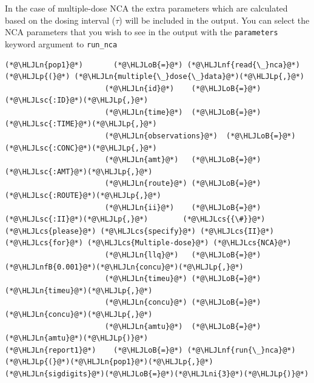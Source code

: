 \documentclass[12pt,a4paper]{article}
\newcommand{\HLJLn}[1]{#1}
\newcommand{\HLJLnf}[1]{\textcolor[RGB]{66,102,213}{#1}}
\newcommand{\HLJLsc}[1]{\textcolor[RGB]{201,61,57}{#1}}
\newcommand{\HLJLnfB}[1]{\textcolor[RGB]{59,151,46}{#1}}
\newcommand{\HLJLni}[1]{\textcolor[RGB]{59,151,46}{#1}}
\newcommand{\HLJLoB}[1]{\textcolor[RGB]{102,102,102}{\textbf{#1}}}
\newcommand{\HLJLp}[1]{#1}
\newcommand{\HLJLcs}[1]{\textcolor[RGB]{153,153,119}{\textit{#1}}}
\begin{document}
In the case of multiple-dose NCA the extra parameters which are calculated based on the dosing interval (\ensuremath{\tau}) will be included in the output. You can select the NCA parameters that you wish to see in the output with the \texttt{parameters} keyword argument to \texttt{run\_nca}


\begin{lstlisting}
(*@\HLJLn{pop1}@*)       (*@\HLJLoB{=}@*) (*@\HLJLnf{read{\_}nca}@*)(*@\HLJLp{(}@*) (*@\HLJLn{multiple{\_}dose{\_}data}@*)(*@\HLJLp{,}@*)
                       (*@\HLJLn{id}@*)    (*@\HLJLoB{=}@*) (*@\HLJLsc{:ID}@*)(*@\HLJLp{,}@*)
                       (*@\HLJLn{time}@*)  (*@\HLJLoB{=}@*) (*@\HLJLsc{:TIME}@*)(*@\HLJLp{,}@*)
                       (*@\HLJLn{observations}@*)  (*@\HLJLoB{=}@*) (*@\HLJLsc{:CONC}@*)(*@\HLJLp{,}@*)
                       (*@\HLJLn{amt}@*)   (*@\HLJLoB{=}@*) (*@\HLJLsc{:AMT}@*)(*@\HLJLp{,}@*)
                       (*@\HLJLn{route}@*) (*@\HLJLoB{=}@*) (*@\HLJLsc{:ROUTE}@*)(*@\HLJLp{,}@*)
                       (*@\HLJLn{ii}@*)    (*@\HLJLoB{=}@*) (*@\HLJLsc{:II}@*)(*@\HLJLp{,}@*)        (*@\HLJLcs{{\#}}@*) (*@\HLJLcs{please}@*) (*@\HLJLcs{specify}@*) (*@\HLJLcs{II}@*) (*@\HLJLcs{for}@*) (*@\HLJLcs{Multiple-dose}@*) (*@\HLJLcs{NCA}@*)
                       (*@\HLJLn{llq}@*)   (*@\HLJLoB{=}@*) (*@\HLJLnfB{0.001}@*)(*@\HLJLn{concu}@*)(*@\HLJLp{,}@*)
                       (*@\HLJLn{timeu}@*) (*@\HLJLoB{=}@*) (*@\HLJLn{timeu}@*)(*@\HLJLp{,}@*)
                       (*@\HLJLn{concu}@*) (*@\HLJLoB{=}@*) (*@\HLJLn{concu}@*)(*@\HLJLp{,}@*)
                       (*@\HLJLn{amtu}@*)  (*@\HLJLoB{=}@*) (*@\HLJLn{amtu}@*)(*@\HLJLp{)}@*)
(*@\HLJLn{report1}@*)    (*@\HLJLoB{=}@*) (*@\HLJLnf{run{\_}nca}@*)(*@\HLJLp{(}@*)(*@\HLJLn{pop1}@*)(*@\HLJLp{,}@*) (*@\HLJLn{sigdigits}@*)(*@\HLJLoB{=}@*)(*@\HLJLni{3}@*)(*@\HLJLp{)}@*)
\end{lstlisting}
\end{document}
